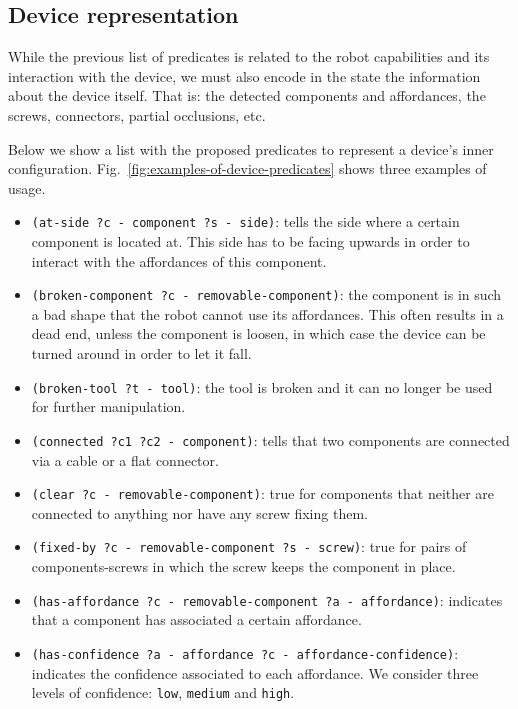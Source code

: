 \documentclass[../root.tex]{subfiles}
\begin{document}
\subsection{Device representation}

While the previous list of predicates is related to
the robot capabilities and its interaction with the
device, we must also encode in the state the information
about the device itself. That is: the detected components
and affordances, the screws, connectors, partial occlusions,
etc.

Below we show a list with the proposed predicates to represent
a device's inner configuration. Fig.~\ref{fig:examples-of-device-predicates}
shows three examples of usage.
\begin{itemize}
	\item \texttt{(at-side ?c - component ?s - side)}: tells the side
	where a certain component is located at. This side has to be facing
	upwards in order to interact with the affordances of this component.
	
	\item \texttt{(broken-component ?c - removable-component)}: the
	component is in such a bad shape that the robot cannot use its
	affordances. This often results in a dead end, unless the component
	is loosen, in which case the device can be turned around in order
	to let it fall.
	
	\item \texttt{(broken-tool ?t - tool)}: the tool is broken
	and it can no longer be used for further manipulation.
	
	\item \texttt{(connected ?c1 ?c2 - component)}: tells that two components
	are connected via a cable or a flat connector.
	
	\item \texttt{(clear ?c - removable-component)}: true for components
	that neither are connected to anything nor have any screw fixing
	them.
	
	\item \texttt{(fixed-by ?c - removable-component ?s - screw)}: true
	for pairs of components-screws in which the screw keeps the component
	in place.
	
	\item \texttt{(has-affordance ?c - removable-component ?a - affordance)}:
	indicates that a component has associated a certain affordance.
	
	\item \texttt{(has-confidence ?a - affordance ?c - affordance-confidence)}:
	indicates the confidence associated to each affordance. We consider
	three levels of confidence: \texttt{low}, \texttt{medium} and
	\texttt{high}.
	

\end{itemize}
\end{document}
